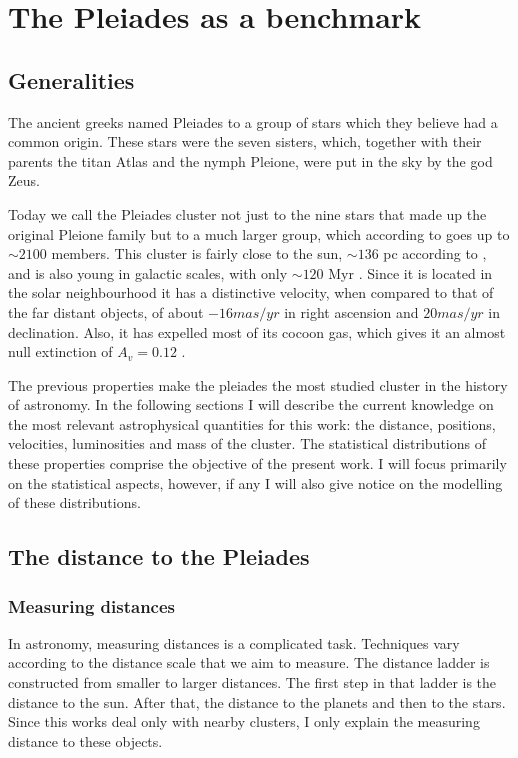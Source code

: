\chapter{The Pleiades as a benchmark}
\label{chap:pleiades}

\section{Generalities}
The ancient greeks named Pleiades to a group of stars which they believe had a common origin. These stars were the seven sisters, which, together with their parents the titan Atlas and the nymph Pleione, were put in the sky  by the god Zeus.
 
Today we call the Pleiades cluster not just to the nine stars that made up the original Pleione family but to a much larger group, which according to \citet{Bouy2015} goes up to $\sim2100$ members. This cluster is fairly close to the sun, $\sim 136$ pc according to \citet{Galli2017}, and is also young in galactic scales, with only $\sim120$ Myr \citep{Stauffer1998}. Since it is located in the solar neighbourhood it has a distinctive velocity, when compared to that of the far distant objects, of about $-16 mas/yr$ in right ascension and $20 mas/yr$ in declination. Also, it has expelled most of its cocoon gas, which gives it an almost null extinction of $A_v=0.12$ \citep{Guthrie1987}. 

The previous properties make the pleiades the most studied cluster in the history of astronomy. In the following sections I will describe the current knowledge on the most relevant astrophysical quantities for this work: the distance, positions, velocities, luminosities and mass of the cluster. The statistical distributions of these properties comprise the objective of the present work. I will focus primarily on the statistical aspects, however, if any I will also give notice on the modelling of these distributions.
 
\section{The distance to the Pleiades}

\subsection{Measuring distances}
In astronomy, measuring distances is a complicated task. Techniques vary according to the distance scale that we aim to measure. The distance ladder is constructed from smaller to larger distances. The first step in that ladder is the distance to the sun. After that, the distance to the planets and then to the stars. Since this works deal only with nearby clusters, I only explain the measuring distance to these objects. 

